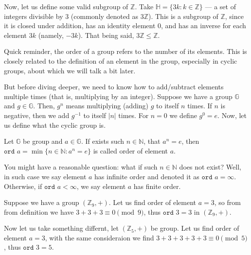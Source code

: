 \documentclass[../lecture-notes-148x210.tex]{subfiles}
\begin{document}
\begin{example}
    Now, let us define some valid subgroup of $\mathbb{Z}$. Take $\mathbb{H} = \{3k: k \in \mathbb{Z}\}$
    --- a set of integers divisible by $3$ (commonly denoted as $3\mathbb{Z}$). This is a subgroup of 
    $\mathbb{Z}$, since it is closed under addition, has an identity element $0$, and has an inverse 
    for each element $3k$ (namely, $-3k$). That being said, $3\mathbb{Z} \leq \mathbb{Z}$.
\end{example}

Quick reminder, the order of a group refers to the number of its elements. This is closely related 
to the definition of an element in the group, especially in cyclic groups, about which we will talk 
a bit later. 

But before diving deeper, we need to know how to add/subtract elements multiple times 
(that is, multiplying by an integer). Suppose we have a group $\mathbb{G}$ and $g \in \mathbb{G}$. 
Then, $g^n$ means multiplying (adding) $g$ to itself $n$ times. If $n$ is negative, then we add 
$g^{-1}$ to itself $|n|$ times. For $n=0$ we define $g^0 = e$. Now, let us define what the cyclic group is.

\begin{definition}
    Let $\mathbb{G}$ be group and $a \in \mathbb{G}$. If exists such $n \in \mathbb{N}$, that 
    $a^{n} = e$, then $\texttt{ord } a = \min\{n \in \mathbb{N} : a^{n} = e \}$ is called
    order of element $a$. 
\end{definition}

You might have a reasonable question: what if such $n \in \mathbb{N}$ does not exist? Well, 
in such case we say element $a$ has infinite order and denoted it as $\texttt{ord } a = \infty$. 
Otherwise, if $\texttt{ord } a < \infty$, we say element $a$ has finite order.

\begin{example}
    Suppose we have a group $(\mathbb{Z}_9, +)$. Let us find order of element $a = 3$, so from from definition we have
    $3 + 3 + 3 \equiv 0 \pmod{9}$, thus $\texttt{ord } 3 = 3$ in $(\mathbb{Z}_9, +)$.
\end{example}

\begin{example}
    Now let us take something differnt, let $(\mathbb{Z}_5, +)$ be group. Let us find order of element $a = 3$, with 
    the same consideraion we find $3 + 3 + 3 + 3 + 3 \equiv 0 \pmod{5}$, thus $\texttt{ord } 3 = 5$.
\end{example}
\end{document}
